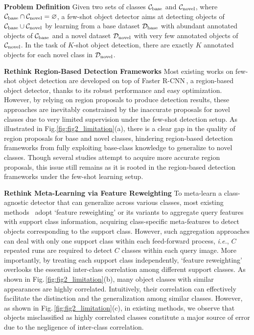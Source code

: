 \documentclass[letterpaper]{article} \usepackage{aaai22}  \usepackage{times}  \usepackage{helvet}  \usepackage{courier}  \usepackage[hyphens]{url}  \usepackage{graphicx} \urlstyle{rm} \def\UrlFont{\rm}  \usepackage{natbib}  \usepackage{caption} \DeclareCaptionStyle{ruled}{labelfont=normalfont,labelsep=colon,strut=off} \frenchspacing  \setlength{\pdfpagewidth}{8.5in}  \setlength{\pdfpageheight}{11in}  \usepackage{algorithm}
\begin{document}
\noindent\textbf{Problem Definition\;\;}
Given two sets of classes $\mathcal{C}_{\rm base}$ and $\mathcal{C}_{\rm novel}$, where $\mathcal{C}_{\rm base} \cap \mathcal{C}_{\rm novel}=\varnothing$, a few-shot object detector aims at detecting objects of $\mathcal{C}_{\rm base} \cup \mathcal{C}_{\rm novel}$ by learning from a base dataset $\mathcal{D}_{\rm base}$ with abundant annotated objects of $\mathcal{C}_{\rm base}$ and a novel dataset $\mathcal{D}_{\rm novel}$ with very few annotated objects of $\mathcal{C}_{\rm novel}$. In the task of $K$-shot object detection, there are exactly $K$ annotated objects for each novel class in $\mathcal{D}_{\rm novel}$.

\vspace{+0.5mm}
\smallskip
\noindent\textbf{Rethink Region-Based Detection Frameworks\;\;}
Most existing works on few-shot object detection are developed on top of Faster R-CNN\,\cite{FasterRCNN}, a region-based object detector, thanks to its robust performance and easy optimization. However, by relying on region proposals to produce detection results, these approaches are inevitably constrained by the inaccurate proposals for novel classes due to very limited supervision under the few-shot detection setup. As illustrated in Fig.\;\ref{fig:fig2_limitation}(a), there is a clear gap in the quality of region proposals for base and novel classes, hindering region-based detection frameworks from fully exploiting base-class knowledge to generalize to novel classes. Though several studies\;\cite{fsod,CoRPN} attempt to acquire more accurate region proposals, this issue still remains as it is rooted in the region-based detection frameworks under the few-shot learning setup.

\smallskip
\vspace{+0.5mm}
\noindent\textbf{Rethink Meta-Learning via Feature Reweighting\;\;}
To meta-learn a class-agnostic detector that can generalize across various classes, most existing methods~\citep{FewshotReweighting,metarcnn,fsod,FSDetView} adopt `feature reweighting' or its variants to aggregate query features with support class information, acquiring class-specific meta-features to detect objects corresponding to the support class. However, such aggregation approaches can deal with only one support class within each feed-forward process, \textit{i.e.}, $C$ repeated runs are required to detect $C$ classes within each query image. More importantly, by treating each support class independently, `feature reweighting' overlooks the essential inter-class correlation among different support classes. As shown in Fig.\,\ref{fig:fig2_limitation}(b), many object classes with similar appearances are highly correlated. Intuitively, their correlation can effectively facilitate the distinction and the generalization among similar classes. However, as shown in Fig.\,\ref{fig:fig2_limitation}(c), in existing methods, we observe that objects misclassified as highly correlated classes constitute a major source of error due to the negligence of inter-class correlation.
\end{document}
